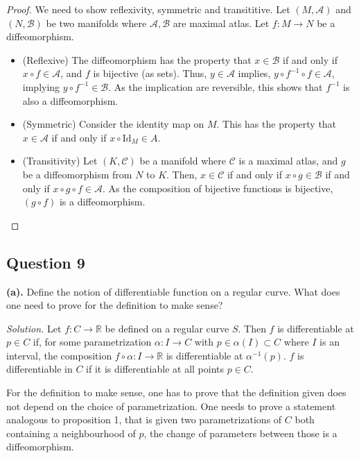 \documentclass[12pt]{article}
\begin{document}
\begin{proof}
    We need to show reflexivity, symmetric and transititive.
    Let $(M, \mathscr A)$ and $(N, \mathscr B)$ be two manifolds where $\mathscr A, \mathscr B$ are
    maximal atlas. Let $f: M \to N$ be a diffeomorphism.
    \begin{itemize}
        \item (Reflexive) The diffeomorphism has the property
        that $x \in \mathscr B$ if and only if $x \circ f \in \mathscr A$,
        and $f$ is bijective (as sets). Thus, $y \in \mathscr A$ implies, $y \circ f^{-1} \circ f \in \mathscr A$,
        implying $y \circ f^{-1} \in \mathscr B$. As the implication are reversible,
        this shows that $f^{-1}$ is also a diffeomorphism.
        \item (Symmetric) Consider the identity map on $M$. This has the property
        that $x \in \mathscr A$ if and only if $x \circ \mathrm{Id}_M \in A$.
        \item (Transitivity) Let $(K, \mathscr C)$ be a manifold where $\mathscr C$ is a maximal atlas,
        and $g$ be a diffeomorphism from $N$ to $K$.
        Then, $x \in \mathscr C$ if and only if $x \circ g \in \mathscr B$ if and only if $x \circ g \circ f \in \mathscr A.$
        As the composition of bijective functions is bijective, $(g \circ f)$ is a diffeomorphism.
    \end{itemize} 
\end{proof}

\subsection*{Question 9}

\textbf{(a).} Define the notion of differentiable function on a regular curve.
              What does one need to prove for the definition to make sense?

\emph{Solution.}
Let \(f: C\to \mathbb{R}\) be defined on a regular curve \(S\).
Then \(f\) is differentiable at \(p\in C\) if,
for some parametrization \(\alpha: I\to C\) with \(p\in \alpha(I)\subset C\) where \(I\) is an interval,
the composition \(f\circ \alpha: I\to \mathbb{R}\) is differentiable at \(\alpha^{-1}(p)\).
\(f\) is differentiable in \(C\) if it is differentiable at all points \(p\in C\).

For the definition to make sense, one has to prove that the definition given does not depend on the choice of parametrization.
One needs to prove a statement analogous to proposition 1, that is given two parametrizations of \(C\) both containing a neighbourhood of \(p\),
the change of parameters between those is a diffeomorphism.
\end{document}
